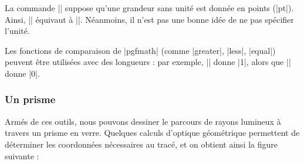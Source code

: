 \documentclass[a4paper]{ltxdoc}
\begin{document}
La commande |\pgfmathsetlength| suppose qu'une grandeur sans unité est donnée en points (|pt|). Ainsi, |\pgfmathsetlength{}| équivaut à |\pgfmathsetlength\hauteurFente{3pt}|. Néanmoins, il n'est pas une bonne idée de ne pas spécifier l'unité.

Les fonctions de comparaison de |pgfmath| (comme |greater|, |less|, |equal|) peuvent être utilisées avec des longueurs : par exemple, |\pgfmathparse{2cm <= 4cm}| donne |1|, alors que |\pgfmathparse{2cm <= 4pt}| donne |0|.

\subsubsection{Un prisme}

Armés de ces outils, nous pouvons dessiner le parcours de rayons lumineux à travers un prisme en verre. Quelques calculs d'optique géométrique permettent de déterminer les coordonnées nécessaires au tracé, et on obtient ainsi la figure suivante :
\end{document}
